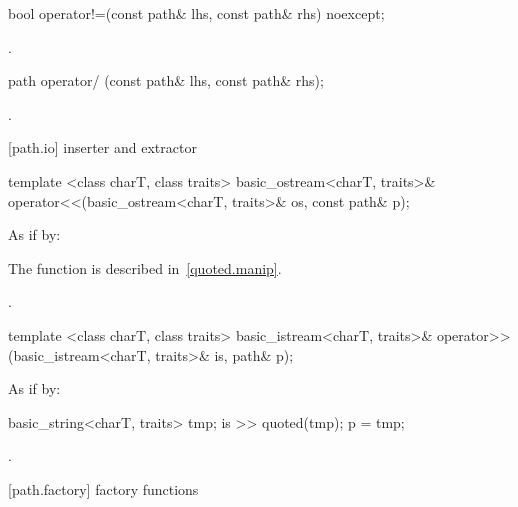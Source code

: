 %
\begin{itemdecl}
bool operator!=(const path& lhs, const path& rhs) noexcept;
\end{itemdecl}

\begin{itemdescr}
\pnum
\returns {}.
\end{itemdescr}

%
\begin{itemdecl}
path operator/ (const path& lhs, const path& rhs);
\end{itemdecl}

\begin{itemdescr}
\pnum
\returns {}.
\end{itemdescr}

[path.io]{ inserter and extractor}

%
\begin{itemdecl}
template <class charT, class traits>
  basic_ostream<charT, traits>&
    operator<<(basic_ostream<charT, traits>& os, const path& p);
\end{itemdecl}

\begin{itemdescr}
\pnum
\effects As if by: 
\begin{note} The  function is described in~\ref{quoted.manip}. \end{note}

\pnum
\returns {}.
\end{itemdescr}

%
\begin{itemdecl}
template <class charT, class traits>
  basic_istream<charT, traits>&
    operator>>(basic_istream<charT, traits>& is, path& p);
\end{itemdecl}

\begin{itemdescr}
\pnum
\effects
As if by:
\begin{codeblock}
basic_string<charT, traits> tmp;
is >> quoted(tmp);
p = tmp;
\end{codeblock}

\pnum
\returns {}.
\end{itemdescr}

[path.factory]{ factory functions}

